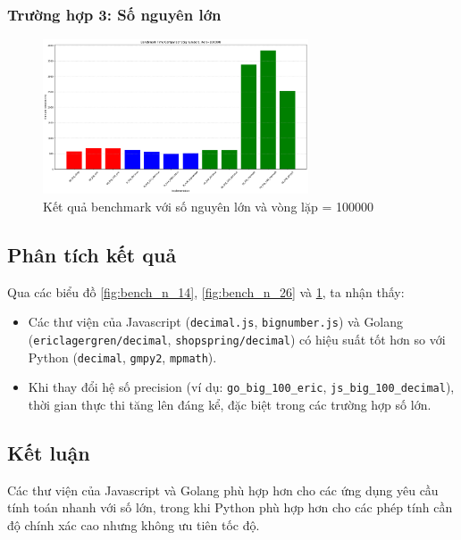 \subsubsection{Trường hợp 3: Số nguyên lớn}
\begin{figure}[h]
    \centering
    \includegraphics[width=0.7\textwidth]{images/big_100000.png}
    \caption{Kết quả benchmark với số nguyên lớn và vòng lặp = 100000}
    \label{fig:bench_big}
\end{figure}

\subsection{Phân tích kết quả}
Qua các biểu đồ \figurename{\ref{fig:bench_n_14}}, \figurename{\ref{fig:bench_n_26}} và \figurename{\ref{fig:bench_big}}, ta nhận thấy:
\begin{itemize}
    \item Các thư viện của Javascript (\texttt{decimal.js}, \texttt{bignumber.js}) và Golang (\texttt{ericlagergren/decimal}, \texttt{shopspring/decimal}) có hiệu suất tốt hơn so với Python (\texttt{decimal}, \texttt{gmpy2}, \texttt{mpmath}).
    \item Khi thay đổi hệ số precision (ví dụ: \texttt{go\_big\_100\_eric}, \texttt{js\_big\_100\_decimal}), thời gian thực thi tăng lên đáng kể, đặc biệt trong các trường hợp số lớn.
\end{itemize}

\subsection{Kết luận}
Các thư viện của Javascript và Golang phù hợp hơn cho các ứng dụng yêu cầu tính toán nhanh với số lớn, trong khi Python phù hợp hơn cho các phép tính cần độ chính xác cao nhưng không ưu tiên tốc độ.